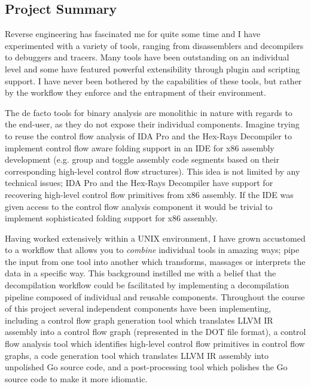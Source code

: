 
\subsection{Project Summary}


Reverse engineering has fascinated me for quite some time and I have experimented with a variety of tools, ranging from disassemblers and decompilers to debuggers and tracers. Many tools have been outstanding on an individual level and some have featured powerful extensibility through plugin and scripting support. I have never been bothered by the capabilities of these tools, but rather by the workflow they enforce and the entrapment of their environment.

The de facto tools for binary analysis are monolithic in nature with regards to the end-user, as they do not expose their individual components. Imagine trying to reuse the control flow analysis of IDA Pro and the Hex-Rays Decompiler to implement control flow aware folding support in an IDE for x86 assembly development (e.g. group and toggle assembly code segments based on their corresponding high-level control flow structures). This idea is not limited by any technical issues; IDA Pro and the Hex-Rays Decompiler have support for recovering high-level control flow primitives from x86 assembly. If the IDE was given access to the control flow analysis component it would be trivial to implement sophisticated folding support for x86 assembly.

Having worked extensively within a UNIX environment, I have grown accustomed to a workflow that allows you to \textit{combine} individual tools in amazing ways; pipe the input from one tool into another which transforms, massages or interprets the data in a specific way. This background instilled me with a belief that the decompilation workflow could be facilitated by implementing a decompilation pipeline composed of individual and reusable components. Throughout the course of this project several independent components have been implementing, including a control flow graph generation tool which translates LLVM IR assembly into a control flow graph (represented in the DOT file format), a control flow analysis tool which identifies high-level control flow primitives in control flow graphs, a code generation tool which translates LLVM IR assembly into unpolished Go source code, and a post-processing tool which polishes the Go source code to make it more idiomatic.

